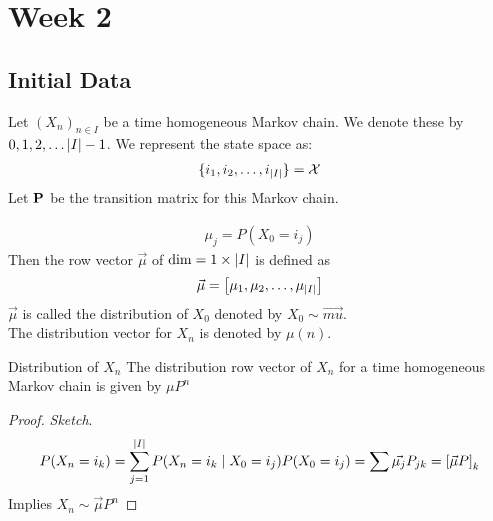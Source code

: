 \documentclass[12pt,a4paper]{article}
\begin{document}
\newpage 

\section{Week 2}
\subsection{Initial Data}
Let $(X_n)_{n\in I}$ be a time homogeneous Markov chain. We denote these by $0, 1, 2, \ldots \abs{I} - 1$. We represent the state space as:
\begin{align*}
    \{i_1, i_2, \ldots, i_{\abs{I}}\} = \mathcal{X}
\end{align*}
Let $\bf P$ be the transition matrix for this Markov chain. 
\begin{defn}
    \begin{align*}
        \mu_j = P(X_0 = i_j)
    \end{align*}
    Then the row vector $\vec{\mu}$ of $\dim = 1 \times \abs{I}$ is defined as 
    \begin{align*}
        \vec{\mu} = \left[\mu_1, \mu_2, \ldots, \mu_{\abs{I}}\right]
    \end{align*} 
    $\vec{\mu}$ is called the distribution of $X_0$ denoted by $X_0 \sim \vec{mu}$.\\
    The distribution vector for $X_n$ is denoted by $\mu(n)$. 
\end{defn}


\begin{thm}{Distribution of $X_n$}
    The distribution row vector of $X_n$ for a time homogeneous Markov chain is given by $\mu P^n$  
\end{thm}
\begin{proof}
    \textit{Sketch}. 
    \begin{align*}
        P(X_n = i_k) = \sum\limits_{j=1}^{\abs{I}}P(X_n = i_k \;\vert\; X_0 = i_j)P(X_0 = i_j) = \sum \vec{\mu_j} P_{jk} = \left[\vec{\mu}P\right]_k
    \end{align*}
    Implies $X_n \sim \vec{\mu}P^n$
\end{proof}
\newpage
\end{document}
